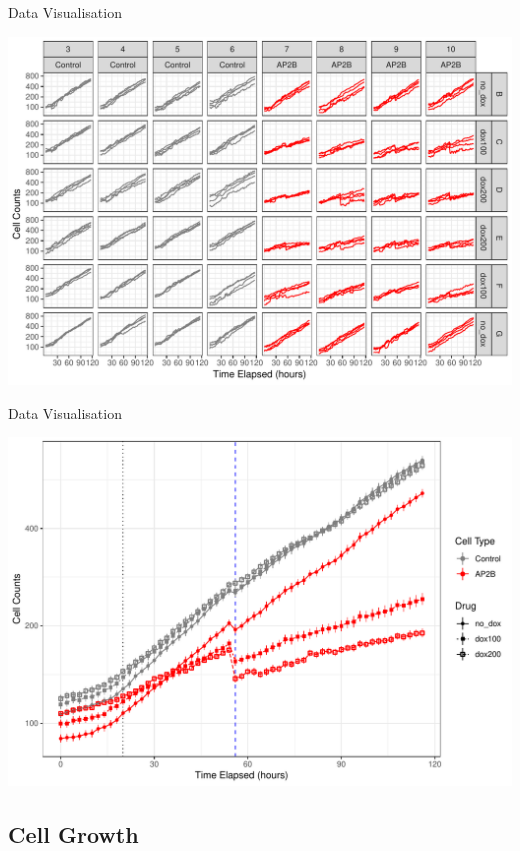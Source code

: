 \documentclass[11pt]{beamer}
\begin{document}
\begin{frame}[fragile]{Data Visualisation}

	\center
	\includegraphics[width=0.75\linewidth]{figures/RawCurves.pdf} \\[5mm]

\end{frame}

\begin{frame}[fragile]{Data Visualisation}
	
	\center
	\includegraphics[width=0.75\linewidth]{figures/SummarisedCurves.pdf} \\[5mm]

\end{frame}

\subsection{Cell Growth}
\end{document}
